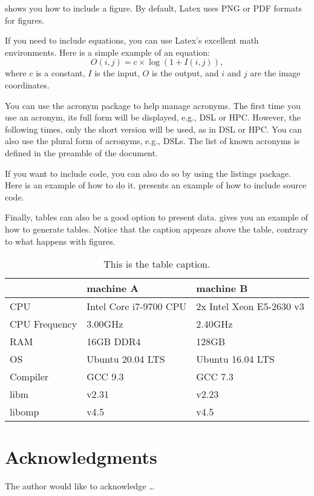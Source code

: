 \documentclass[sigconf,balance,nonacm,authordraft]{acmart}
\begin{document}
 shows you how to include a figure. By default, Latex uses PNG or PDF formats for figures.

If you need to include equations, you can use Latex's excellent math environments. Here is a simple example of an equation:
\begin{equation}\label{eq:log}
    O(i, j) = c \times \log{(1+I(i, j))},
\end{equation}
where $c$ is a constant, $I$ is the input, $O$ is the output, and $i$ and $j$ are the image coordinates.

You can use the acronym package to help manage acronyms. The first time you use an acronym, its full form will be displayed, e.g., \ac{DSL} or \ac{HPC}. However, the following times, only the short version will be used, as in \ac{DSL} or \ac{HPC}. You can also use the plural form of acronyms, e.g., \acp{DSL}. The list of known acronyms is defined in the preamble of the document.



If you want to include code, you can also do so by using the listings package. Here is an example of how to do it.  presents an example of how to include source code.

Finally, tables can also be a good option to present data.  gives you an example of how to generate tables. Notice that the caption appears above the table, contrary to what happens with figures.

\begin{table}[b]
\caption{This is the table caption.}
\label{tab:table1}
\footnotesize
\begin{tabular}{lll}
\toprule
         & machine A                   & machine B                           \\
\midrule
CPU      & Intel Core i7-9700 CPU      & 2x Intel Xeon E5-2630 v3            \\
CPU Frequency& 3.00GHz                     & 2.40GHz                             \\
RAM      & 16GB DDR4                   & 128GB                               \\
OS       & Ubuntu 20.04 LTS            & Ubuntu 16.04 LTS                    \\
Compiler & GCC 9.3                     & GCC 7.3                             \\
libm     & v2.31                       & v2.23                               \\
libomp   & v4.5                        & v4.5                                \\
\bottomrule
\end{tabular}
\end{table}

\section*{Acknowledgments}
The author would like to acknowledge \ldots



\end{document}
